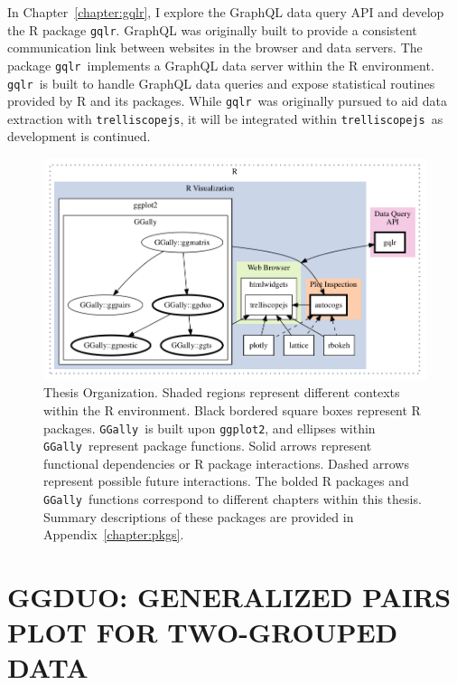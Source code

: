 \documentclass[stat,dissertation]{puthesis}\usepackage[]{graphicx}\usepackage{xcolor}
\newcommand{\pkg}[1]{\texttt{#1}}
\newcommand{\ggplot}{\pkg{ggplot2}}
\newcommand{\trelliscopejs}{\pkg{trelliscopejs}}
\newcommand{\gqlr}{\pkg{gqlr}}
\newcommand{\GGally}{\pkg{GGally}}
\begin{document}
In Chapter~\ref{chapter:gqlr}, I explore the GraphQL data query API and develop the R package \gqlr.  GraphQL was originally built to provide a consistent communication link between websites in the browser and data servers. The package  \gqlr~implements a GraphQL data server within the R environment. \gqlr~is built to handle GraphQL data queries and expose statistical routines provided by R and its packages. While \gqlr~was originally pursued to aid data extraction with \trelliscopejs, it will be integrated within \trelliscopejs~as development is continued.


\begin{figure}[H]
  \label{fig:structure}
  \centering
  \includegraphics[width=\textwidth]{./dot/intro_hierarchy.png}
  \caption[Thesis Organization]{Thesis Organization.  Shaded regions represent different contexts within the R environment.  Black bordered square boxes represent R packages.   \GGally~is built upon \ggplot, and ellipses within \GGally~represent package functions.  Solid arrows represent functional dependencies or R package interactions.  Dashed arrows represent possible future interactions.  The bolded R packages and \GGally~functions correspond to different chapters within this thesis.  Summary descriptions of these packages are provided in Appendix~\ref{chapter:pkgs}.}
\end{figure}



\chapter{GGDUO: GENERALIZED PAIRS PLOT FOR TWO-GROUPED DATA} \label{chapter:ggduo}
\end{document}

